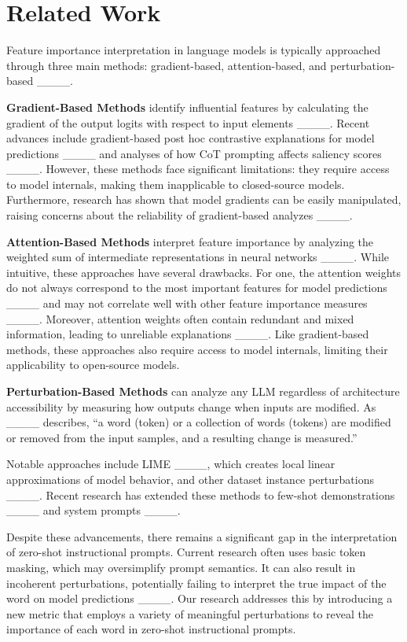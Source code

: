 \section{Related Work}
Feature importance interpretation in language models is typically approached through three main methods: gradient-based, attention-based, and perturbation-based ____.

\textbf{Gradient-Based Methods} identify influential features by calculating the gradient of the output logits with respect to input elements ____. Recent advances include gradient-based post hoc contrastive explanations for model predictions ____ and analyses of how CoT prompting affects saliency scores ____. However, these methods face significant limitations: they require access to model internals, making them inapplicable to closed-source models. Furthermore, research has shown that model gradients can be easily manipulated, raising concerns about the reliability of gradient-based analyzes ____.

\textbf{Attention-Based Methods} interpret feature importance by analyzing the weighted sum of intermediate representations in neural networks ____. While intuitive, these approaches have several drawbacks. For one, the attention weights do not always correspond to the most important features for model predictions ____ and may not correlate well with other feature importance measures ____. Moreover, attention weights often contain redundant and mixed information, leading to unreliable explanations ____. Like gradient-based methods, these approaches also require access to model internals, limiting their applicability to open-source models.

\textbf{Perturbation-Based Methods} can analyze any LLM regardless of architecture accessibility by measuring how outputs change when inputs are modified. As ____ describes, ``a word (token) or a collection of words (tokens) are modified or removed from the input samples, and a resulting change is measured.''

Notable approaches include LIME ____, which creates local linear approximations of model behavior, and other dataset instance perturbations ____. Recent research has extended these methods to few-shot demonstrations ____ and system prompts ____.

Despite these advancements, there remains a significant gap in the interpretation of zero-shot instructional prompts. Current research often uses basic token masking, which may oversimplify prompt semantics. It can also result in incoherent perturbations, potentially failing to interpret the true impact of the word on model predictions ____. Our research addresses this by introducing a new metric that employs a variety of meaningful perturbations to reveal the importance of each word in zero-shot instructional prompts. 

